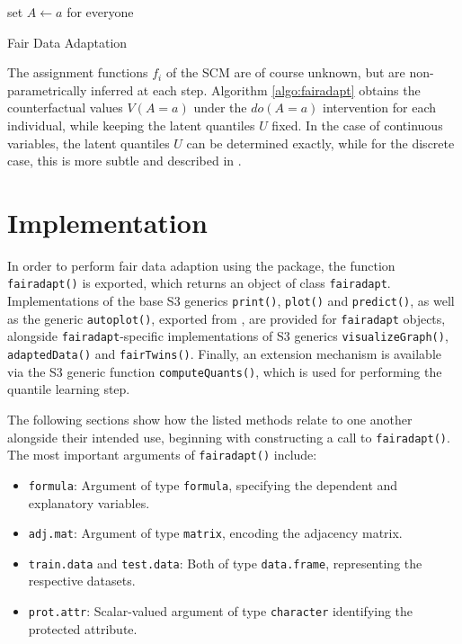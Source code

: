 \documentclass[
  nojss]{jss}
\providecommand{\tightlist}{%
  \setlength{\itemsep}{0pt}\setlength{\parskip}{0pt}}
\begin{document}
\begin{algorithm}
    \DontPrintSemicolon
    set $A \gets a$ for everyone\\
    \caption{Fair Data Adaptation}
    \label{algo:fairadapt}
\end{algorithm}

The assignment functions \(f_i\) of the SCM are of course unknown, but
are non-parametrically inferred at each step. Algorithm
\ref{algo:fairadapt} obtains the counterfactual values \(V(A = a)\)
under the \(do(A = a)\) intervention for each individual, while keeping
the latent quantiles \(U\) fixed. In the case of continuous variables,
the latent quantiles \(U\) can be determined exactly, while for the
discrete case, this is more subtle and described in
\citet[Section~5]{plecko2020fair}.

\hypertarget{implementation}{%
\section{Implementation}\label{implementation}}

In order to perform fair data adaption using the 
package, the function \texttt{fairadapt()} is exported, which returns an
object of class \texttt{fairadapt}. Implementations of the base
 S3 generics \texttt{print()}, \texttt{plot()} and
\texttt{predict()}, as well as the generic \texttt{autoplot()}, exported
from  \citep{wickham2016ggplot2}, are provided for
\texttt{fairadapt} objects, alongside \texttt{fairadapt}-specific
implementations of S3 generics \texttt{visualizeGraph()},
\texttt{adaptedData()} and \texttt{fairTwins()}. Finally, an extension
mechanism is available via the S3 generic function
\texttt{computeQuants()}, which is used for performing the quantile
learning step.

The following sections show how the listed methods relate to one another
alongside their intended use, beginning with constructing a call to
\texttt{fairadapt()}. The most important arguments of
\texttt{fairadapt()} include:

\begin{itemize}
\tightlist
\item
  \texttt{formula}: Argument of type \texttt{formula}, specifying the
  dependent and explanatory variables.
\item
  \texttt{adj.mat}: Argument of type \texttt{matrix}, encoding the
  adjacency matrix.
\item
  \texttt{train.data} and \texttt{test.data}: Both of type
  \texttt{data.frame}, representing the respective datasets.
\item
  \texttt{prot.attr}: Scalar-valued argument of type \texttt{character}
  identifying the protected attribute.
\end{itemize}
\end{document}
